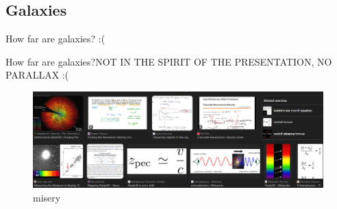 \documentclass[12pt]{beamer}
\begin{document}
    \subsection{Galaxies}
        \begin{frame}{How far are galaxies?} \centering
            :(
        \end{frame}
        \begin{frame}{How far are galaxies?}{NOT IN THE SPIRIT OF THE PRESENTATION, NO PARALLAX :(}
            \begin{figure}
                \includegraphics[scale=0.22]{redshift.png}
                \caption{misery}
            \end{figure}
        \end{frame}
\end{document}
